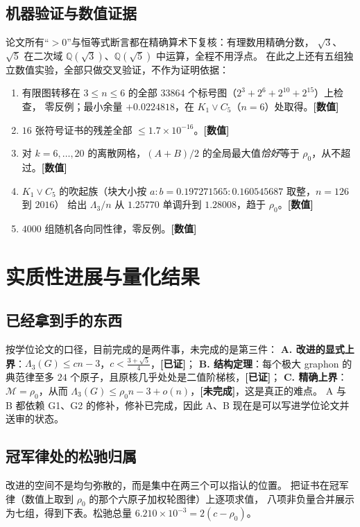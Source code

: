 \documentclass[UTF8,11pt]{ctexart}
\newcommand{\Lam}{\Lambda}
\newcommand{\M}{\mathcal{M}}
\newcommand{\ok}{\textcolor[rgb]{0.05,0.45,0.15}{\bfseries [已证]}}
\newcommand{\num}{\textcolor[rgb]{0.55,0.35,0.00}{\bfseries [数值]}}
\newcommand{\todo}{\textcolor[rgb]{0.70,0.15,0.10}{\bfseries [未完成]}}
\begin{document}
\subsection{机器验证与数值证据}\label{sec:num}

论文所有``$>0$''与恒等式断言都在精确算术下复核：有理数用精确分数，
$\sqrt3$、$\sqrt5$ 在二次域 $\mathbb Q(\sqrt3)$、$\mathbb Q(\sqrt5)$ 中运算，全程不用浮点。
在此之上还有五组独立数值实验，全部只做交叉验证，不作为证明依据：
\begin{enumerate}[leftmargin=2em,itemsep=2pt]
\item 有限图转移在 $3\le n\le6$ 的全部 $33864$ 个标号图（$2^3+2^6+2^{10}+2^{15}$）上检查，
零反例；最小余量 $+0.0224818$，在 $K_1\vee C_5$（$n=6$）处取得。\num
\item $16$ 张符号证书的残差全部 $\le1.7\times10^{-16}$。\num
\item 对 $k=6,\ldots,20$ 的离散网格，$(A+B)/2$ 的全局最大值\emph{恰好}等于 $\rho_0$，从不超过。\num
\item $K_1\vee C_5$ 的吹起族（块大小按 $a:b=0.197271565:0.160545687$ 取整，$n=126$ 到 $2016$）
给出 $\Lam_3/n$ 从 $1.25770$ 单调升到 $1.28008$，趋于 $\rho_0$。\num
\item $4000$ 组随机各向同性律，零反例。\num
\end{enumerate}

\section{实质性进展与量化结果}\label{sec:slack}

\subsection{已经拿到手的东西}

按学位论文的口径，目前完成的是两件事，未完成的是第三件：
\textbf{A. 改进的显式上界}：$\Lam_3(G)\le cn-3$，$c<\frac{3+\sqrt5}{4}$，\ok；
\textbf{B. 结构定理}：每个极大 graphon 的典范律至多 $24$ 个原子，且原核几乎处处是二值阶梯核，\ok；
\textbf{C. 精确上界}：$\M=\rho_0$，从而 $\Lam_3(G)\le\rho_0n-3+o(n)$，\todo，这是真正的难点。
A 与 B 都依赖 G1、G2 的修补，修补已完成，因此 A、B 现在是可以写进学位论文并送审的状态。

\subsection{冠军律处的松驰归属}

改进的空间不是均匀弥散的，而是集中在两三个可以指认的位置。
把证书在冠军律（数值上取到 $\rho_0$ 的那个六原子加权轮图律）上逐项求值，
八项非负量合并展示为七组，得到下表。松驰总量 $6.210\times10^{-3}=2(c-\rho_0)$。
\end{document}
